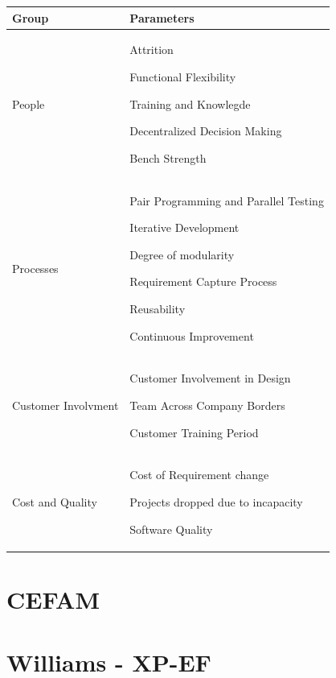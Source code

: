 \begin{tabular}{| p{3cm} | p{12cm}|}
    \hline
     \textbf{Group} & \textbf{Parameters} \\ \hline
     People  &  \begin{inparaenum} [a\upshape)] \item Attrition \item Functional Flexibility \item Training and Knowlegde \item Decentralized Decision Making \item Bench Strength \end{inparaenum} \\ \hline
     Processes  & \begin{inparaenum} [a\upshape)] \item Pair Programming and Parallel Testing \item Iterative Development \item Degree of modularity \item Requirement Capture Process \item Reusability \item Continuous Improvement
     \end{inparaenum} \\ \hline
    Customer Involvment & \begin{inparaenum} [a\upshape)] \item Customer Involvement in Design \item Team Across Company Borders \item Customer Training Period \end{inparaenum} \\ \hline
     Cost and Quality  & \begin{inparaenum} [a\upshape)] \item Cost of Requirement change \item Projects dropped due to incapacity \item Software Quality \end{inparaenum} \\ \hline
  \end{tabular}

\section{CEFAM}

\section{Williams - XP-EF}

